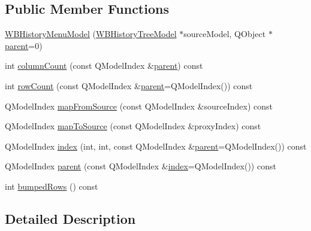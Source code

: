 \subsection*{Public Member Functions}
\begin{DoxyCompactItemize}
\item 
\hyperlink{class_w_b_history_menu_model_acc085e54691c957c1385b9a7173a1384}{W\-B\-History\-Menu\-Model} (\hyperlink{class_w_b_history_tree_model}{W\-B\-History\-Tree\-Model} $\ast$source\-Model, Q\-Object $\ast$\hyperlink{class_w_b_history_menu_model_a7227782496c8f45c0d6fac8242f118ac}{parent}=0)
\item 
int \hyperlink{class_w_b_history_menu_model_add1b0a9f0768e67367a019f2339df5a5}{column\-Count} (const Q\-Model\-Index \&\hyperlink{class_w_b_history_menu_model_a7227782496c8f45c0d6fac8242f118ac}{parent}) const 
\item 
int \hyperlink{class_w_b_history_menu_model_a75d85c1443b525666ae80b92e3e13cff}{row\-Count} (const Q\-Model\-Index \&\hyperlink{class_w_b_history_menu_model_a7227782496c8f45c0d6fac8242f118ac}{parent}=Q\-Model\-Index()) const 
\item 
Q\-Model\-Index \hyperlink{class_w_b_history_menu_model_a94841023273c5225c0fe24a2712d9840}{map\-From\-Source} (const Q\-Model\-Index \&source\-Index) const 
\item 
Q\-Model\-Index \hyperlink{class_w_b_history_menu_model_aad8819cb25e3283e30144bf0a5b46768}{map\-To\-Source} (const Q\-Model\-Index \&proxy\-Index) const 
\item 
Q\-Model\-Index \hyperlink{class_w_b_history_menu_model_abd393feb20688f50da497bed2c9607f4}{index} (int, int, const Q\-Model\-Index \&\hyperlink{class_w_b_history_menu_model_a7227782496c8f45c0d6fac8242f118ac}{parent}=Q\-Model\-Index()) const 
\item 
Q\-Model\-Index \hyperlink{class_w_b_history_menu_model_a7227782496c8f45c0d6fac8242f118ac}{parent} (const Q\-Model\-Index \&\hyperlink{class_w_b_history_menu_model_abd393feb20688f50da497bed2c9607f4}{index}=Q\-Model\-Index()) const 
\item 
int \hyperlink{class_w_b_history_menu_model_a73376f863cf4067e3a023f8ad0bb06dd}{bumped\-Rows} () const 
\end{DoxyCompactItemize}


\subsection{Detailed Description}


